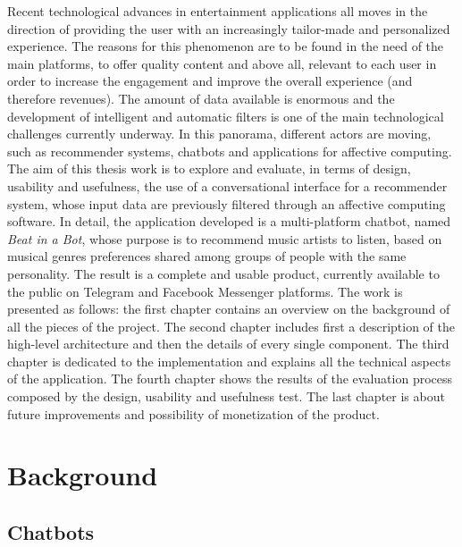 \documentclass[b5paper,10pt,twoside,cucitura]{toptesi}
\begin{document}
Recent technological advances in entertainment applications all moves in the direction of providing the user with an increasingly tailor-made and personalized experience. The reasons for this phenomenon are to be found in the need of the main platforms, to offer quality content and above all, relevant to each user in order to increase the engagement and improve the overall experience (and therefore revenues). The amount of data available is enormous and the development of intelligent and automatic filters is one of the main technological challenges currently underway. In this panorama, different actors are moving, such as recommender systems, chatbots and applications for affective computing. The aim of this thesis work is to explore and evaluate, in terms of design, usability and usefulness, the use of a conversational interface for a recommender system, whose input data are previously filtered through an affective computing software. In detail, the application developed is a multi-platform chatbot, named \textit{Beat in a Bot}, whose purpose is to recommend music artists to listen, based on musical genres preferences shared among groups of people with the same personality. The result is a complete and usable product, currently available to the public on Telegram and Facebook Messenger platforms. The work is presented as follows: the first chapter contains an overview on the background of all the pieces of the project. The second chapter includes first a description of the high-level architecture and then the details of every single component. The third chapter is dedicated to the implementation  and explains all the technical aspects of the application. The fourth chapter shows the results of the evaluation process composed by the design, usability and usefulness test. The last chapter is about future improvements and possibility of monetization of the product. 

\chapter{Background}

\section{Chatbots}
\end{document}
